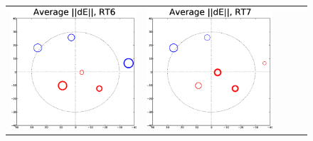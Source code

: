 \documentclass[]{aa}
\begin{document}
\begin{figure}
\begin{tabular}{@{}c@{}c@{}c@{}c@{}c@{}}
\includegraphics[width=\roguewidth]{o2006_dE_ant6} &
\includegraphics[width=\roguewidth]{o2006_dE_ant7} &

\end{tabular}
\end{figure}
\end{document}
